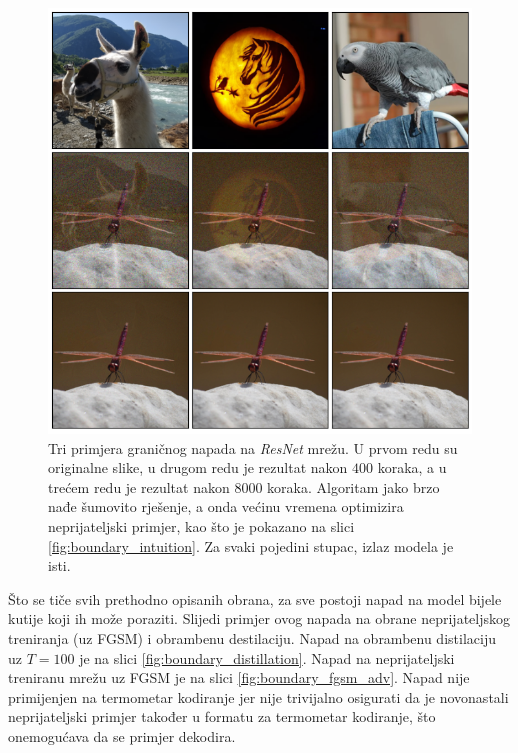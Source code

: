 \documentclass[utf8, diplomski]{fer}
\begin{document}
\begin{figure}[H]
\centering
\includegraphics[width=1.0\textwidth,keepaspectratio]{img/results/boundary_triple.png}
\caption{Tri primjera graničnog napada na \textit{ResNet} mrežu. U prvom redu su originalne slike, u drugom redu je rezultat nakon $400$ koraka, a u trećem redu je rezultat nakon $8000$ koraka. Algoritam jako brzo nađe šumovito rješenje, a onda većinu vremena optimizira neprijateljski primjer, kao što je pokazano na slici \ref{fig:boundary_intuition}. Za svaki pojedini stupac, izlaz modela je isti.}
\label{fig:boundary_triple}
\end{figure}

Što se tiče svih prethodno opisanih obrana, za sve postoji napad na model bijele kutije koji ih može poraziti. Slijedi primjer ovog napada na obrane neprijateljskog treniranja (uz FGSM) i obrambenu destilaciju. Napad na obrambenu distilaciju uz $T = 100$ je na slici \ref{fig:boundary_distillation}. Napad na neprijateljski treniranu mrežu uz FGSM je na slici \ref{fig:boundary_fgsm_adv}. Napad nije primijenjen na termometar kodiranje jer nije trivijalno osigurati da je novonastali neprijateljski primjer također u formatu za termometar kodiranje, što onemogućava da se primjer dekodira. \\
\end{document}
